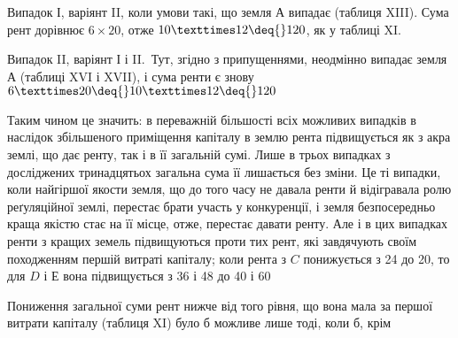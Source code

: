 Випадок І, варіянт II, коли умови такі, що земля $А$ випадає (таблиця XIII).
Сума рент дорівнює $6 × 20$, отже $10 × 12 \deq{} 120$, як у таблиці XI.

Випадок II, варіянт І і II.~Тут, згідно з припущеннями, неодмінно випадає
земля $А$ (таблиці XVI і XVII), і сума ренти є знову $6 × 20 \deq{} 10 × 12 \deq{}
120$

Таким чином це значить: в переважній більшості всіх можливих випадків
в наслідок збільшеного приміщення капіталу в землю рента підвищується як
з акра землі, що дає ренту, так і в її загальній сумі. Лише в трьох випадках
з досліджених тринадцятьох загальна сума її лишається без зміни. Це ті випадки,
коли найгіршої якости земля, що до того часу не давала ренти й відігравала
ролю реґуляційної землі, перестає брати участь у конкуренції, і земля безпосередньо
краща якістю стає на її місце, отже, перестає давати ренту. Але і в
цих випадках ренти з кращих земель підвищуються проти тих рент, які завдячують
своїм походженням першій витраті капіталу; коли рента з $C$ понижується
з 24 до 20, то для $D$ і $Е$ вона підвищується з 36 і 48 до 40 і 60

Пониження загальної суми рент нижче від того рівня, що вона мала за
першої витрати капіталу (таблиця XI) було б можливе лише тоді, коли б, крім
\parbreak{}  %
